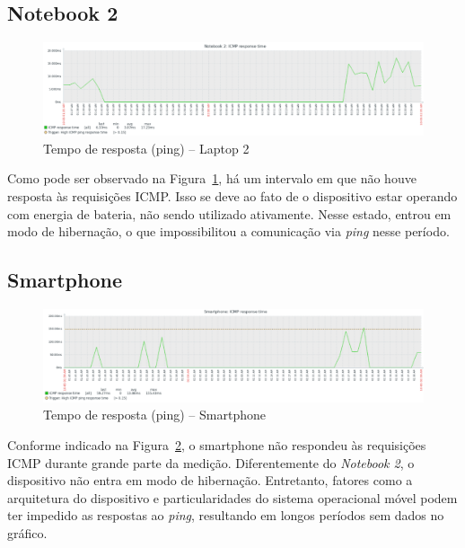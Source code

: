 \documentclass[12pt]{article}
\begin{document}
\subsection{Notebook 2}

\begin{figure}[h!]
  \centering
  \includegraphics[width=0.9\linewidth]{Laptop_2.png}
  \caption{Tempo de resposta (ping) – Laptop 2}
  \label{fig:laptop_2_ping}
\end{figure}

Como pode ser observado na Figura~\ref{fig:laptop_2_ping}, há um intervalo em que não houve resposta às requisições ICMP. Isso se deve ao fato de o dispositivo estar operando com energia de bateria, não sendo utilizado ativamente. Nesse estado, entrou em modo de hibernação, o que impossibilitou a comunicação via \textit{ping} nesse período.

\subsection{Smartphone}

\begin{figure}[h!]
  \centering
  \includegraphics[width=0.9\linewidth]{Smartphone.png}
  \caption{Tempo de resposta (ping) – Smartphone}
  \label{fig:smartphone_ping}
\end{figure}

Conforme indicado na Figura~\ref{fig:smartphone_ping}, o smartphone não respondeu às requisições ICMP durante grande parte da medição. Diferentemente do \textit{Notebook 2}, o dispositivo não entra em modo de hibernação. Entretanto, fatores como a arquitetura do dispositivo e particularidades do sistema operacional móvel podem ter impedido as respostas ao \textit{ping}, resultando em longos períodos sem dados no gráfico.



\newpage
\newpage



\end{document}
